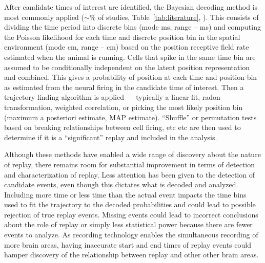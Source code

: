 \documentclass[11pt]{article}
\begin{document}
After candidate times of interest are identified, the Bayesian decoding method is most commonly applied ($\sim$\SurveyBayesFraction\% of studies, Table~\ref{tab:literature}, \cite{ZhangInterpretingNeuronalPopulation1998,BrownStatisticalParadigmNeural1998}). This consists of dividing the time period into discrete bins (mode \SurveyTimeBinMode{} ms, range \SurveyTimeBinMin--\SurveyTimeBinMax{} ms) and computing the Poisson likelihood for each time and discrete position bin in the spatial environment (mode \SurveyPositionBinMode{} cm, range \SurveyPositionBinMin--\SurveyPositionBinMax{} cm) based on the position receptive field rate estimated when the animal is running. Cells that spike in the same time bin are assumed to be conditionally independent on the latent position representation and combined. This gives a probability of position at each time and position bin as estimated from the neural firing in the candidate time of interest. Then a trajectory finding algorithm is applied — typically a linear fit, radon transformation, weighted correlation, or picking the most likely position bin (maximum a posteriori estimate, MAP estimate). “Shuffle” or permutation tests based on breaking relationships between cell firing, etc etc \cite{FosterReplayComesAge2017} are then used to determine if it is a “significant” replay and included in the analysis.

Although these methods have enabled a wide range of discovery about the nature of replay, there remains room for substantial improvement in terms of detection and characterization of replay. Less attention has been given to the detection of candidate events, even though this dictates what is decoded and analyzed. Including more time or less time than the actual event impacts the time bins used to fit the trajectory to the decoded probabilities and could lead to possible rejection of true replay events. Missing events could lead to incorrect conclusions about the role of replay or simply less statistical power because there are fewer events to analyze. As recording technology enables the simultaneous recording of more brain areas, having inaccurate start and end times of replay events could hamper discovery of the relationship between replay and other other brain areas.
\end{document}
